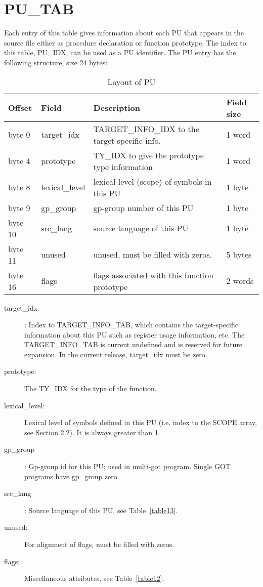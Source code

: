 \section{PU\_TAB}

Each entry of this table gives information about each
%
PU that appears
in the source file either as procedure declaration or function
prototype. The index to this table, PU\_IDX, can be used as a
%
PU
identifier. The
%
PU entry has the following structure, size 24 bytes:


\begin{table}[h]
\centering
\caption{Layout of PU} 
\label{table11} 
\begin{tabular}{|l|l|l|l|}\hline
Offset &Field &Description &Field size\\\hline\hline
byte 0 &target\_idx &TARGET\_INFO\_IDX to the target-specific info. &1
word \\\hline

byte 4 &prototype &TY\_IDX to give the prototype type information &1 word \\\hline
byte 8 & lexical\_level &lexical level (scope) of symbols in this
\index{PU}%
PU &1
byte \\\hline
byte 9 &gp\_group &gp-group number of this
\index{PU}%
PU &1 byte \\\hline
byte 10 &src\_lang &source language of this
\index{PU}%
PU &1 byte\\\hline
byte 11 &unused& unused, must be filled with zeros. &5 bytes \\\hline
byte 16 &flags &flags associated with this function prototype &2 words\\\hline
\end{tabular}
\end{table}

\begin{description}

\item[target\_idx]: Index to TARGET\_INFO\_TAB, which contains the
target-specific information about this
%
PU such as register usage
information, etc. The
%
TARGET\_INFO\_TAB is current undefined and is
  reserved for future expansion. In the current release, target\_idx
  must be zero.

\item[prototype:] The
%
TY\_IDX for the type of the function.
\item[lexical\_level:] Lexical level of symbols defined in this
%
PU
(i.e. index to the
%
SCOPE array, see Section 2.2). It is always
  greater than 1.

\item[gp\_group]: Gp-group id for this PU; used in multi-got program.
Single
%
GOT programs have gp\_group zero.

\item[src\_lang]: Source language of this PU, see Table~\ref{table13}. 
\item[unused:] For alignment of flags, must be filled with zeros. 
\item[flags:] Miscellaneous attributes, see Table~\ref{table12}. 
\end{description}


